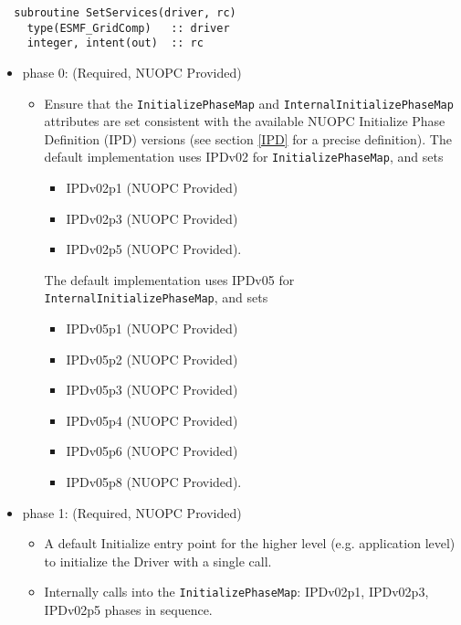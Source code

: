 \begin{verbatim}  subroutine SetServices(driver, rc)
    type(ESMF_GridComp)   :: driver
    integer, intent(out)  :: rc
\end{verbatim}

\begin{itemize}
\item phase 0: ({\sc Required, NUOPC Provided})
  \begin{itemize}
  \item Ensure that the {\tt InitializePhaseMap} and {\tt InternalInitializePhaseMap} attributes are set consistent with the available NUOPC Initialize Phase Definition (IPD) versions (see section \ref{IPD} for a precise definition). The default implementation uses IPDv02 for {\tt InitializePhaseMap}, and sets
    \begin{itemize}
    \item IPDv02p1  ({\sc NUOPC Provided})
    \item IPDv02p3  ({\sc NUOPC Provided})
    \item IPDv02p5  ({\sc NUOPC Provided}).
    \end{itemize}  
 The default implementation uses IPDv05 for {\tt InternalInitializePhaseMap}, and sets
    \begin{itemize}
    \item IPDv05p1  ({\sc NUOPC Provided})
    \item IPDv05p2  ({\sc NUOPC Provided})
    \item IPDv05p3  ({\sc NUOPC Provided})
    \item IPDv05p4  ({\sc NUOPC Provided})
    \item IPDv05p6  ({\sc NUOPC Provided})
    \item IPDv05p8  ({\sc NUOPC Provided}).
    \end{itemize}    
  \end{itemize}  
\item phase 1: ({\sc Required, NUOPC Provided})
  \begin{itemize}
    \item A default Initialize entry point for the higher level (e.g. application level) to initialize the Driver with a single call.
    \item Internally calls into the  {\tt InitializePhaseMap}: IPDv02p1, IPDv02p3, IPDv02p5 phases in sequence.
  \end{itemize}  


\end{itemize}
